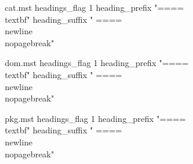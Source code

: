 \makeindex[name=cat,intoc=false] %
\begin{filecontents*}{cat.mst}
headings_flag 1
heading_prefix "{==== \\textbf{"
heading_suffix " ====\\newline}}\\nopagebreak\n"
\end{filecontents*}

\makeindex[name=dom,intoc=false] %
\begin{filecontents*}{dom.mst}
headings_flag 1
heading_prefix "{==== \\textbf{"
heading_suffix " ====\\newline}}\\nopagebreak\n"
\end{filecontents*}

\makeindex[name=pkg,intoc=false] %
\begin{filecontents*}{pkg.mst}
headings_flag 1
heading_prefix "{==== \\textbf{"
heading_suffix " ====\\newline}}\\nopagebreak\n"
\end{filecontents*}

\usepackage{hyperref} %

\usepackage[toc,page]{appendix} 

\usepackage{float} %

\usepackage{mathtools}

\usepackage{amssymb}

\usepackage{axiom} %

\usepackage{enumitem} %


